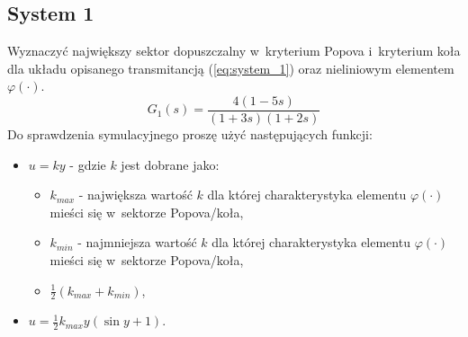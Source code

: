 \documentclass{sprawozdanie-agh}
\begin{document}
    \subsection{System 1}\label{sec:system_1}
    Wyznaczyć największy sektor dopuszczalny w~kryterium Popova i~kryterium koła dla układu opisanego transmitancją (\ref{eq:system_1}) oraz nieliniowym elementem $\varphi(\cdot)$.%
    \begin{equation}
        \label{eq:system_1}
        G_{1}(s) = \frac{4(1-5s)}{(1+3s)(1+2s)}
    \end{equation}
    Do sprawdzenia symulacyjnego proszę użyć następujących funkcji:
    \begin{itemize}
        \item $u = ky$ - gdzie $k$ jest dobrane jako:
        \begin{itemize}
            \item $k_{max}$ - największa wartość $k$ dla której charakterystyka
            elementu $\varphi(\cdot)$ mieści się w~sektorze Popova/koła,
            \item $k_{min}$ - najmniejsza wartość $k$ dla której charakterystyka
            elementu $\varphi(\cdot)$ mieści się w~sektorze Popova/koła,
            \item $\frac{1}{2}(k_{max} + k_{min})$,
        \end{itemize}
        \item $u = \frac{1}{2}k_{max}y(\sin{y} + 1)$.
    \end{itemize}

\end{document}
